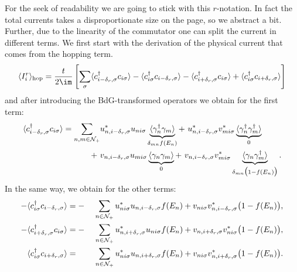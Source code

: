 \documentclass[../main.tex]{subfile}
\begin{document}
For the seek of readability we are going to stick with this $r$-notation. In fact the total currents takes a disproportionate size on the page, so we abstract a bit.
Further, due to the linearity of the commutator one can split the current in different terms. We first start with the derivation of the physical current
that comes from the hopping term.
\begin{equation*}
    \begin{aligned}
    \langle I_i^r\rangle_{\text{hop}} = \frac{t}{2\im}\left[ \sum_{\sigma} 
        \langle c_{i-\delta_{r},\sigma}^{\dagger} c_{i\sigma}\rangle
        -\langle c_{i\sigma}^{\dagger}            c_{i-\delta_{r},\sigma}\rangle
        -\langle c_{i+\delta_{r},\sigma}^{\dagger} c_{i\sigma}\rangle
        +\langle c_{i\sigma}^{\dagger}            c_{i+\delta_{r},\sigma}\rangle\right]
\end{aligned}
\end{equation*}
and after introducing the BdG-transformed operators we obtain for the first term:
\begin{equation*}
    \begin{aligned}
        \color{TamGreen}{\langle c_{i-\delta_r,\sigma}^{\dagger} c_{i\sigma}\rangle} \color{black}= \sum_{n,m\in\mathcal{N}_+} 
        &u_{n,i-\delta_r,\sigma}^{\ast} u_{ni\sigma} \underbrace{\langle \gamma_n^{\dagger}\gamma_m\rangle}_{\delta_{mn}f(E_n)} 
        +~ u_{n,i-\delta_r,\sigma}^{\ast} v_{mi\sigma}^{\ast} \underbrace{\langle \gamma_n^{\dagger}\gamma_m^{\dagger}\rangle}_{0}\\
        +~& v_{n,i-\delta_r,\sigma}u_{mi\sigma}\underbrace{\langle \gamma_n\gamma_m\rangle}_{0}
        +~ v_{n,i-\delta_r,\sigma}v_{mi\sigma}^{\ast}\underbrace{\langle \gamma_n\gamma_m^{\dagger}\rangle}_{\delta_{mn}\bigl(1-f(E_n)\bigr)}.
    \end{aligned}
\end{equation*}
In the same way, we obtain for the other terms:
\begin{alignat*}{2}
    -\color{TamGreen}{\langle c_{i\sigma}^{\dagger}c_{i-\delta_{r},\sigma}\rangle} &= -&\sum_{n\in\mathcal{N}_+} u_{ni\sigma}^{\ast}u_{n,i-\delta_r,\sigma} f(E_n) + v_{ni\sigma}v_{n,i-\delta_r,\sigma}^{\ast}\bigl(1-f(E_n)\bigr),\\
    -\color{TamTangerine}{\langle c_{i+\delta_{r},\sigma}^{\dagger}c_{i\sigma}\rangle} &= -&\sum_{n\in\mathcal{N}_+} u_{n,i+\delta_r,\sigma}^{\ast}u_{ni\sigma} f(E_n) + v_{n,i+\delta_r,\sigma}v_{ni\sigma}^{\ast}\bigl(1-f(E_n)\bigr),\\
    \color{TamTangerine}{\langle c_{i\sigma}^{\dagger}c_{i+\delta_{r},\sigma}\rangle} &=  &~\sum_{n\in\mathcal{N}_+} u_{ni\sigma}^{\ast}u_{n,i+\delta_r,\sigma} f(E_n) + v_{ni\sigma}v_{n,i+\delta_r,\sigma}^{\ast}\bigl(1-f(E_n)\bigr).
\end{alignat*}
\end{document}
